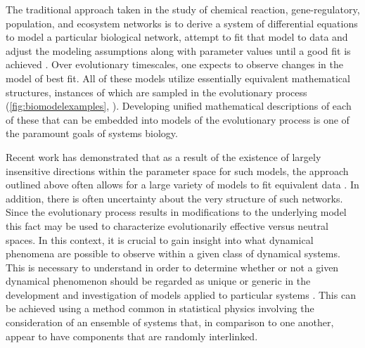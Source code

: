 The traditional approach taken in the study of chemical reaction, gene-regulatory, population, and ecosystem networks is to derive a system of differential equations to model a particular biological network, attempt to fit that model to data and adjust the modeling assumptions along with parameter values until a good fit is achieved \cite{Meyer2014}. Over evolutionary timescales, one expects to observe changes in the model of best fit. All of these models utilize essentially equivalent mathematical structures, instances of which are sampled in the evolutionary process (\ref{fig:biomodelexamples}, \cite{RossCr2003,Palsson2011a,Sauro2012}). Developing unified mathematical descriptions of each of these that can be embedded into models of the evolutionary process is one of the paramount goals of systems biology.

Recent work has demonstrated that as a result of the existence of largely insensitive directions within the parameter space for such models, the approach outlined above often allows for a large variety of models to fit equivalent data \cite{Machta2013,Hines2014,Prabakaran2014,Tonsing2014}. In addition, there is often uncertainty about the very structure of such networks. Since the evolutionary process results in modifications to the underlying model this fact may be used to characterize evolutionarily effective versus neutral spaces. In this context, it is crucial to gain insight into what dynamical phenomena are possible to observe within a given class of dynamical systems. This is necessary to understand in order to determine whether or not a given dynamical phenomenon should be regarded as unique or generic in the development and investigation of models applied to particular systems \cite{Gunawardena2013,Gunawardena2014}. This can be achieved using a method common in statistical physics involving the consideration of an ensemble of systems that, in comparison to one another, appear to have components that are randomly interlinked.


